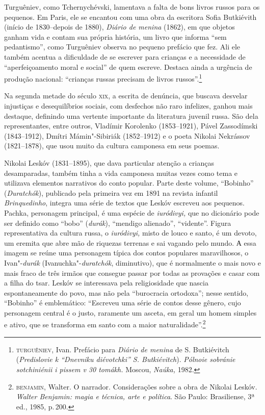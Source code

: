 Turguêniev, como Tchernychévski, lamentava a falta de bons livros russos
para os pequenos. Em Paris, ele se encantou com uma obra da escritora
Sofia Butkiévith (início de 1830--depois de 1880), \emph{Diário de
menina} (1862), em que objetos ganham vida e contam sua própria
história, um livro que informa ``sem pedantismo'', como Turguêniev
observa no pequeno prefácio que fez. Ali ele também acentua a
dificuldade de se escrever para crianças e a necessidade de
``aperfeiçoamento moral e social'' de quem escreve. Destaca ainda a
urgência de produção nacional: ``crianças russas precisam de livros
russos''.\footnote{\textsc{turguêniev}, Ivan. Prefácio para \emph{Diário de menina}
  de S. Butkiévitch (\emph{Predislovie k “Dnevniku diévotchki” S. Butkiévitch}). \emph{Pólnoie sobránie sotchiniénii i pissem v 30 tomákh.} Moscou,
  \emph{Naúka,} 1982.}

Na segunda metade do século \textsc{xix}, a escrita de denúncia, que buscava
desvelar injustiças e desequilíbrios sociais, com desfechos não raro
infelizes, ganhou mais destaque, definindo uma vertente importante da
literatura juvenil russa. São dela representantes, entre outros,
Vladímir Korolenko (1853--1921), Pável Zassodímski (1843--1912), Dmítri
Mámin"-Sibiriák (1852--1912) e o poeta Nikolai Nekrássov (1821--1878),
que usou muito da cultura camponesa em seus poemas.

Nikolai Leskóv (1831--1895), que dava particular atenção a crianças desamparadas,
também tinha a vida camponesa muitas vezes como tema e utilizava
elementos narrativos do conto popular. Parte deste volume, ``Bobinho''
(\emph{Duratchók}), publicado pela primeira vez em 1891 na revista
infantil \emph{Brinquedinho}, integra uma série de textos que
Leskóv escreveu aos pequenos. Pachka, personagem principal, é uma
espécie de \emph{iuródivyi,} que no dicionário pode ser definido como
``bobo'' (\emph{durák}), ``mendigo alienado'', ``vidente''. Figura
representativa da cultura russa, o \emph{iuródivyi,} misto de louco e
santo, é um devoto, um eremita que abre mão de riquezas terrenas e sai
vagando pelo mundo. А essa imagem se reúne uma personagem típica dos
contos populares maravilhosos, o Ivan"-\emph{durák}
(Ivanuchka"-\emph{duratchók}, diminutivo), que é normalmente o mais novo e mais fraco
de três irmãos que consegue passar por todas as provações e casar com a
filha do tsar. Leskóv se interessava pela religiosidade que nascia
espontaneamente do povo, mas não pela ``burocracia ortodoxa''; nesse
sentido, ``Bobinho'' é emblemático: ``Escreveu uma série de
contos desse gênero, cujo personagem central é o justo, raramente um
asceta, em geral um homem simples e ativo, que se transforma em santo
com a maior naturalidade''.\footnote{\textsc{benjamin}, Walter. O narrador.
  Considerações sobre a obra de Nikolai Leskóv. \emph{Walter Benjamin:
  magia e técnica, arte e política}. São Paulo: Brasiliense, 3ª ed.,
  1985, p.\,200.}

